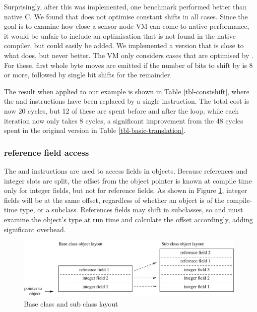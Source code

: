 Surprisingly, after this was implemented, one benchmark performed better than native C. We found that  does not optimise constant shifts in all cases. Since the goal is to examine how close a sensor node VM can come to native performance, it would be unfair to include an optimisation that is not found in the native compiler, but could easily be added. We implemented a version that is close to what  does, but never better. The VM only considers cases that are optimised by . For these, first whole byte moves are emitted if the number of bits to shift by is 8 or more, followed by single bit shifts for the remainder.

The result when applied to our example is shown in Table \ref{tbl-constshift}, where the  and  instructions have been replaced by a single  instruction. The total cost is now 20 cycles, but 12 of these are spent before and after the loop, while each iteration now only takes 8 cycles, a significant improvement from the 48 cycles spent in the original version in Table \ref{tbl-basic-translation}.


\subsubsection{ reference field access}
The  and  instructions are used to access fields in objects. Because references and integer slots are split, the offset from the object pointer is known at compile time only for integer fields, but not for reference fields. As shown in Figure \ref{fig-super-class-sub-class-field-layout}, integer fields will be at the same offset, regardless of whether an object is of the compile-time type, or a subclass. References fields may shift in subclasses, so  and  must examine the object's type at run time and calculate the offset accordingly, adding significant overhead.

\begin{figure}
\centering
\includegraphics[width=0.7\linewidth]{super-class-sub-class-field-layout.eps}
\caption{Base class and sub class layout}
\label{fig-super-class-sub-class-field-layout}
\end{figure}

